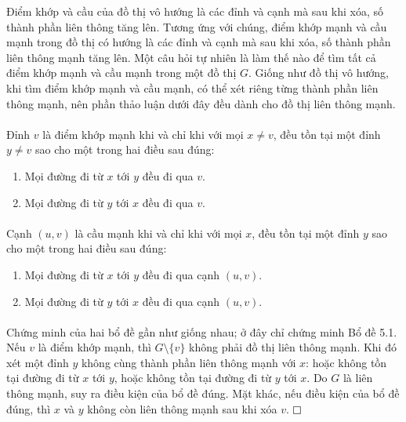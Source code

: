 \documentclass[11pt]{article}
\newcommand{\proofbox}{\ensuremath{\vcenter{\hrule height 0.45pt
  \hbox{\vrule width 0.45pt height 6pt\kern 6pt\vrule width 0.45pt}
  \hrule height 0.45pt}}}
\begin{document}
Điểm khớp và cầu của đồ thị vô hướng là các đỉnh và cạnh mà sau khi xóa, số
thành phần liên thông tăng lên. Tương ứng với chúng, điểm khớp mạnh và cầu mạnh
trong đồ thị có hướng là các đỉnh và cạnh mà sau khi xóa, số thành phần liên
thông mạnh tăng lên. Một câu hỏi tự nhiên là làm thế nào để tìm tất cả điểm
khớp mạnh và cầu mạnh trong một đồ thị \(G\). Giống như đồ thị vô hướng, khi
tìm điểm khớp mạnh và cầu mạnh, có thể xét riêng từng thành phần liên thông
mạnh, nên phần thảo luận dưới đây đều dành cho đồ thị liên thông mạnh.

\paragraph{}
Đỉnh \(v\) là điểm khớp mạnh khi và chỉ khi với mọi \(x\ne v\), đều tồn tại một
đỉnh \(y\ne v\) sao cho một trong hai điều sau đúng:

\begin{enumerate}
  \item Mọi đường đi từ \(x\) tới \(y\) đều đi qua \(v\).
  \item Mọi đường đi từ \(y\) tới \(x\) đều đi qua \(v\).
\end{enumerate}

\paragraph{}
Cạnh \((u,v)\) là cầu mạnh khi và chỉ khi với mọi \(x\), đều tồn tại một đỉnh
\(y\) sao cho một trong hai điều sau đúng:

\begin{enumerate}
  \item Mọi đường đi từ \(x\) tới \(y\) đều đi qua cạnh \((u,v)\).
  \item Mọi đường đi từ \(y\) tới \(x\) đều đi qua cạnh \((u,v)\).
\end{enumerate}

\paragraph{}
Chứng minh của hai bổ đề gần như giống nhau; ở đây chỉ chứng minh Bổ đề 5.1.
Nếu \(v\) là điểm khớp mạnh, thì \(G\setminus\{v\}\) không phải đồ thị liên
thông mạnh. Khi đó xét một đỉnh \(y\) không cùng thành phần liên thông mạnh với
\(x\): hoặc không tồn tại đường đi từ \(x\) tới \(y\), hoặc không tồn tại đường
đi từ \(y\) tới \(x\). Do \(G\) là liên thông mạnh, suy ra điều kiện của bổ đề
đúng. Mặt khác, nếu điều kiện của bổ đề đúng, thì \(x\) và \(y\) không còn liên
thông mạnh sau khi xóa \(v\). \proofbox
\end{document}
